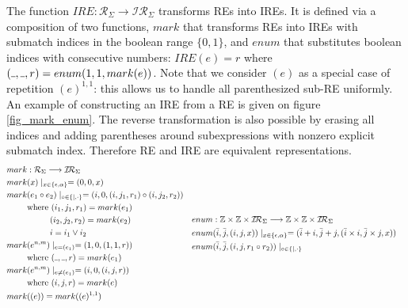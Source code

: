 \documentclass[AMA,STIX1COL]{WileyNJD-v2}
\newcommand{\Xund}{\rule{.4em}{.4pt}}
\newcommand{\XI}{\mathcal{I}}
\newcommand{\XIR}{\XI\!\XR}
\newcommand{\XR}{\mathcal{R}}
\newcommand{\YZ}{\mathbb{Z}}
\newcommand{\IRE}{I\!RE}
\begin{document}
The function $\IRE : \XR_\Sigma \rightarrow \XIR_\Sigma$ transforms REs into IREs.
It is defined via a composition of two functions,
$mark$ that transforms REs into IREs with submatch indices in the boolean range $\{0, 1\}$,
and $enum$ that substitutes boolean indices with consecutive numbers:
$\IRE(e) = r$ where $(\Xund, \Xund, r) = enum(1, 1, mark(e))$.
Note that we consider $(e)$ as a special case of repetition $(e)^{1,1}$:
this allows us to handle all parenthesized sub-RE uniformly.
An example of constructing an IRE from a RE is given on figure \ref{fig_mark_enum}.
The reverse transformation is also possible by erasing all indices
and adding parentheses around subexpressions with nonzero explicit submatch index.
Therefore RE and IRE are equivalent representations.
    \begin{align*}
    &\begin{aligned}
        mark &: \XR_\Sigma \longrightarrow \XIR_\Sigma \\
        mark &(x) \mid_{x \in \{\epsilon, \alpha\}} = (0, 0, x) \\
        mark &(e_1 \circ e_2) \mid_{\circ \in \{|,\cdot\}} = (i, 0,
            (i, j_1, r_1) \circ
            (i, j_2, r_2)
            ) \\
            &\text{where }            (i_1, j_1, r_1) = mark(e_1) \\
            &\space{\hphantom{where }}(i_2, j_2, r_2) = mark(e_2) \\
            &\space{\hphantom{where }}i = i_1 \vee i_2 \\
        mark &(e^{n, m}) \mid_{e = (e_1)} = (1, 0, (1, 1, r)) \\
            &\text{where } (\Xund, \Xund, r) = mark(e_1) \\
        mark &(e^{n, m}) \mid_{e \neq (e_1)} = (i, 0, (i, j, r)) \\
            &\text{where } (i, j, r) = mark(e) \\
        mark &((e)) = mark((e)^{1, 1})
    \end{aligned}
    &&\begin{aligned}
        enum &: \YZ \times \YZ \times \XIR_\Sigma \longrightarrow \YZ \times \YZ \times \XIR_\Sigma \\
        enum &(\bar{i}, \bar{j}, (i, j, x)) \mid_{x \in \{\epsilon, \alpha\}}
            = (\bar{i} + i, \bar{j} + j, (\bar{i} \times i, \bar{j} \times j, x))
        \\
        enum &(\bar{i}, \bar{j}, (i, j, r_1 \circ r_2)) \mid_{\circ \in \{|,\cdot\}}

\end{aligned}
\end{align*}
\end{document}
